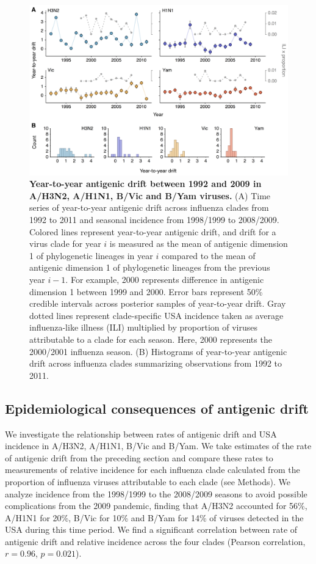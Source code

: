 \documentclass[11pt,oneside,letterpaper]{article}
\begin{document}
\begin{figure}[h]
	\centering		
	\includegraphics[width=1.0\textwidth]{figures/jumps}
	\caption{\textbf{Year-to-year antigenic drift between 1992 and 2009 in A/H3N2, A/H1N1, B/Vic and B/Yam viruses.} 
	(A) Time series of year-to-year antigenic drift across influenza clades from 1992 to 2011 and seasonal incidence from 1998/1999 to 2008/2009.
	Colored lines represent year-to-year antigenic drift, and drift for a virus clade for year $i$ is measured as the mean of antigenic dimension 1 of phylogenetic lineages in year $i$ compared to the mean of antigenic dimension 1 of phylogenetic lineages from the previous year $i-1$.
	For example, 2000 represents difference in antigenic dimension 1 between 1999 and 2000.
	Error bars represent 50\% credible intervals across posterior samples of year-to-year drift.
	Gray dotted lines represent clade-specific USA incidence taken as average influenza-like illness (ILI) multiplied by proportion of viruses attributable to a clade for each season.
	Here, 2000 represents the 2000/2001 influenza season.
	(B) Histograms of year-to-year antigenic drift across influenza clades summarizing observations from 1992 to 2011.
	} 
	\label{jumps} 
\end{figure}

\subsection*{Epidemiological consequences of antigenic drift}

We investigate the relationship between rates of antigenic drift and USA incidence in A/H3N2, A/H1N1, B/Vic and B/Yam.
We take estimates of the rate of antigenic drift from the preceding section and compare these rates to measurements of relative incidence for each influenza clade calculated from the proportion of influenza viruses attributable to each clade (see Methods).
We analyze incidence from the 1998/1999 to the 2008/2009 seasons to avoid possible complications from the 2009 pandemic, finding that A/H3N2 accounted for 56\%, A/H1N1 for 20\%, B/Vic for 10\% and B/Yam for 14\% of viruses detected in the USA during this time period.
We find a significant correlation between rate of antigenic drift and relative incidence across the four clades  (Pearson correlation, $r=0.96$, $p = 0.021$).
\end{document}
